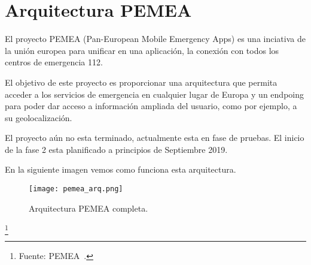 
\section{Arquitectura PEMEA}

El proyecto PEMEA (Pan-European Mobile Emergency Apps) es una
 inciativa de la unión europea para unificar en una aplicación, la conexión 
con todos los centros de emergencia 112.

El objetivo de este proyecto es proporcionar una arquitectura que permita
 acceder a los servicios de emergencia en cualquier lugar de Europa y un 
endpoing para poder dar acceso a información ampliada del usuario, como
 por ejemplo, a su geolocalización.

El proyecto aún no esta terminado, actualmente esta en fase de pruebas.
 El inicio de la fase 2 esta planificado a principios de Septiembre 2019.

En la siguiente imagen vemos como funciona esta arquitectura.

\begin{figure}[h]
\texttt{[image: pemea\_arq.png]} 
\caption{Arquitectura PEMEA completa.}
\end{figure}

\footnote{Fuente: PEMEA~\cite{PEMEA}.}